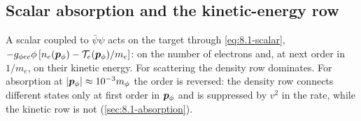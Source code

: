 \subsection{Scalar absorption and the kinetic-energy row}\label{sec:10.7-scalar}

A scalar coupled to $\bar\psi\psi$ acts on the target through \cref{eq:8.1-scalar}, $-g_{\phi ee}\phi\,[n_e(\bm{p}_\phi) - \mathcal{T}_e(\bm{p}_\phi)/m_e]$: on the number of electrons and, at next order in $1/m_e$, on their kinetic energy. For scattering the density row dominates. For absorption at $|\bm{p}_\phi| \approx 10^{-3}m_\phi$ the order is reversed: the density row connects different states only at first order in $\bm{p}_\phi$ and is suppressed by $v^2$ in the rate, while the kinetic row is not (\cref{sec:8.1-absorption}).

